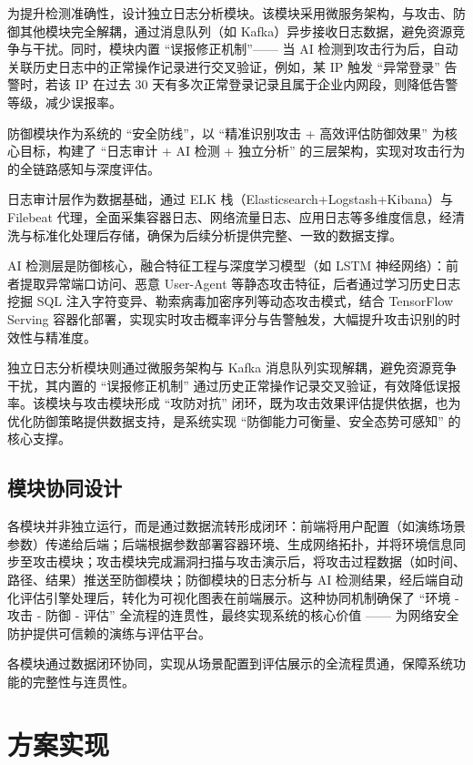 \documentclass[lang=cn,10pt]{elegantbook}
\begin{document}
为提升检测准确性，设计独立日志分析模块。该模块采用微服务架构，与攻击、防御其他模块完全解耦，通过消息队列（如 Kafka）异步接收日志数据，避免资源竞争与干扰。同时，模块内置 “误报修正机制”—— 当 AI 检测到攻击行为后，自动关联历史日志中的正常操作记录进行交叉验证，例如，某 IP 触发 “异常登录” 告警时，若该 IP 在过去 30 天有多次正常登录记录且属于企业内网段，则降低告警等级，减少误报率。

\begin{proposition}
    防御模块作为系统的 “安全防线”，以 “精准识别攻击 + 高效评估防御效果” 为核心目标，构建了 “日志审计 + AI 检测 + 独立分析” 的三层架构，实现对攻击行为的全链路感知与深度评估。​
    
日志审计层作为数据基础，通过 ELK 栈（Elasticsearch+Logstash+Kibana）与 Filebeat 代理，全面采集容器日志、网络流量日志、应用日志等多维度信息，经清洗与标准化处理后存储，确保为后续分析提供完整、一致的数据支撑。​

AI 检测层是防御核心，融合特征工程与深度学习模型（如 LSTM 神经网络）：前者提取异常端口访问、恶意 User-Agent 等静态攻击特征，后者通过学习历史日志挖掘 SQL 注入字符变异、勒索病毒加密序列等动态攻击模式，结合 TensorFlow Serving 容器化部署，实现实时攻击概率评分与告警触发，大幅提升攻击识别的时效性与精准度。​

独立日志分析模块则通过微服务架构与 Kafka 消息队列实现解耦，避免资源竞争干扰，其内置的 “误报修正机制” 通过历史正常操作记录交叉验证，有效降低误报率。该模块与攻击模块形成 “攻防对抗” 闭环，既为攻击效果评估提供依据，也为优化防御策略提供数据支持，是系统实现 “防御能力可衡量、安全态势可感知” 的核心支撑。
\end{proposition}


\section{模块协同设计}
各模块并非独立运行，而是通过数据流转形成闭环：前端将用户配置（如演练场景参数）传递给后端；后端根据参数部署容器环境、生成网络拓扑，并将环境信息同步至攻击模块；攻击模块完成漏洞扫描与攻击演示后，将攻击过程数据（如时间、路径、结果）推送至防御模块；防御模块的日志分析与 AI 检测结果，经后端自动化评估引擎处理后，转化为可视化图表在前端展示。这种协同机制确保了 “环境 - 攻击 - 防御 - 评估” 全流程的连贯性，最终实现系统的核心价值 —— 为网络安全防护提供可信赖的演练与评估平台。
\begin{definition}
    各模块通过数据闭环协同，实现从场景配置到评估展示的全流程贯通，保障系统功能的完整性与连贯性。
\end{definition}

\chapter{方案实现}
\end{document}
